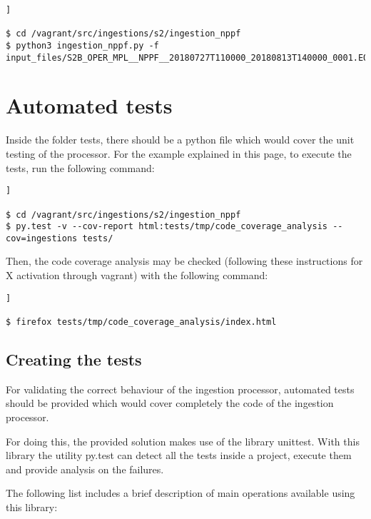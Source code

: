 \begin{lstlisting}[breaklines=true, style=bash]]

$ cd /vagrant/src/ingestions/s2/ingestion_nppf
$ python3 ingestion_nppf.py -f input_files/S2B_OPER_MPL__NPPF__20180727T110000_20180813T140000_0001.EOF

\end{lstlisting}

\section{Automated tests}

Inside the folder tests, there should be a python file which would cover the unit testing of the processor. For the example explained in this page, to execute the tests, run the following command:

\begin{lstlisting}[breaklines=true, style=bash]]

$ cd /vagrant/src/ingestions/s2/ingestion_nppf
$ py.test -v --cov-report html:tests/tmp/code_coverage_analysis --cov=ingestions tests/

\end{lstlisting}

Then, the code coverage analysis may be checked (following these instructions for X activation through vagrant) with the following command:

\begin{lstlisting}[breaklines=true, style=bash]]

$ firefox tests/tmp/code_coverage_analysis/index.html

\end{lstlisting}

\subsection{Creating the tests}

For validating the correct behaviour of the ingestion processor, automated tests should be provided which would cover completely the code of the ingestion processor.

For doing this, the provided solution makes use of the library unittest. With this library the utility py.test can detect all the tests inside a project, execute them and provide analysis on the failures.

The following list includes a brief description of main operations available using this library:

